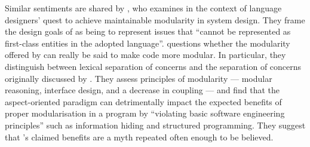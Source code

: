 Similar sentiments are shared by \citet{przybylek2010wrong}, who examines \aop{}
in the context of language designers' quest to achieve maintainable modularity
in system design. They frame the design goals of \aspectorientation{} as being
to represent issues that ``cannot be represented as first-class entities in the
adopted language''. \citeauthor{przybylek2010wrong} questions whether the
modularity offered by \aspectorientation{} can really be said to make code more
modular. In particular, they distinguish between lexical separation of concerns
and the separation of concerns originally discussed by
\citet{djikstra_scientific_thought}. They assess principles of modularity ---
modular reasoning, interface design, and a decrease in coupling --- and find
that the aspect-oriented paradigm can detrimentally impact the expected benefits
of proper modularisation in a program by ``violating basic software engineering
principles'' such as information hiding and structured programming. They suggest
that \aspectorientation{}'s claimed benefits are a myth repeated often enough to
be believed.





